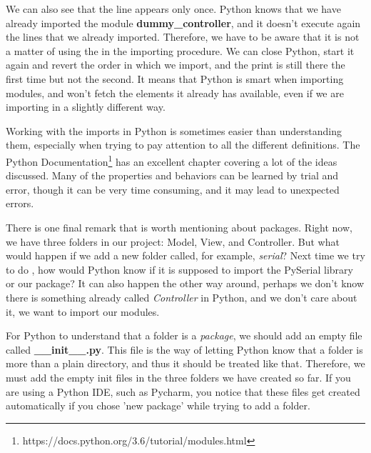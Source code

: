 We can also see that the line  appears only once. Python knows that we have already imported the module \textbf{dummy\_controller}, and it doesn't execute again the lines that we already imported. Therefore, we have to be aware that it is not a matter of using the  in the importing procedure. We can close Python, start it again and revert the order in which we import, and the print is still there the first time but not the second. It means that Python is smart when importing modules, and won't fetch the elements it already has available, even if we are importing in a slightly different way.


Working with the imports in Python is sometimes easier than understanding them, especially when trying to pay attention to all the different definitions. The Python Documentation\footnote{https://docs.python.org/3.6/tutorial/modules.html} has an excellent chapter covering a lot of the ideas discussed. Many of the properties and behaviors can be learned by trial and error, though it can be very time consuming, and it may lead to unexpected errors.

There is one final remark that is worth mentioning about packages. Right now, we have three folders in our project: Model, View, and Controller. But what would happen if we add a new folder called, for example, \emph{serial}? Next time we try to do , how would Python know if it is supposed to import the PySerial library or our package? It can also happen the other way around, perhaps we don't know there is something already called \emph{Controller} in Python, and we don't care about it, we want to import our modules.

For Python to understand that a folder is a \emph{package}, we should add an empty file called \textbf{\_\_init\_\_.py}. This file is the way of letting Python know that a folder is more than a plain directory, and thus it should be treated like that. Therefore, we must add the empty init files in the three folders we have created so far. If you are using a Python IDE, such as Pycharm, you notice that these files get created automatically if you chose 'new package' while trying to add a folder.

